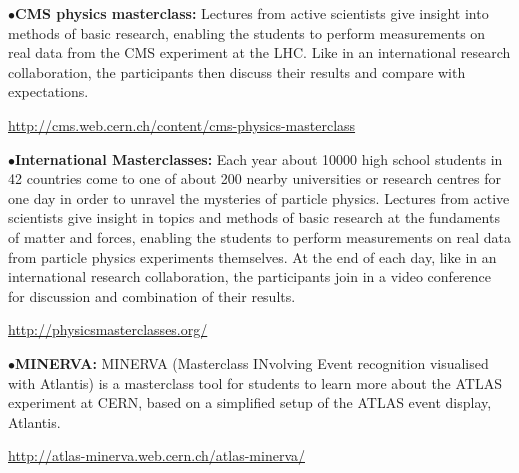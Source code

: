 



\medskip

\item{$\bullet$}{\bf CMS physics masterclass:}
Lectures from active scientists give insight into methods of basic research, enabling the students to perform measurements on real data from the CMS experiment at the LHC. Like in an international research collaboration, the participants then discuss their results and compare with expectations.
	\item{}\qquad\url{http://cms.web.cern.ch/content/cms-physics-masterclass}

\medskip

\item{$\bullet$}{\bf International Masterclasses:}
Each year about 10000 high school students in 42 countries come to one of about 200 nearby universities or research centres for one day in order to unravel the mysteries of particle physics. Lectures from active scientists give insight in topics and methods of basic research at the fundaments of matter and forces, enabling the students to perform measurements on real data from particle physics experiments themselves. At the end of each day, like in an international research collaboration, the participants join in a video conference for discussion and combination of their results.
	\item{}\qquad\url{http://physicsmasterclasses.org/}

\medskip

\item{$\bullet$}{\bf MINERVA:}
MINERVA (Masterclass INvolving Event recognition visualised with Atlantis) is a masterclass tool for students to learn more about the ATLAS experiment at CERN, based on a simplified setup of the ATLAS event display, Atlantis.
	\item{}\qquad\url{http://atlas-minerva.web.cern.ch/atlas-minerva/}

\medskip
\medskip


